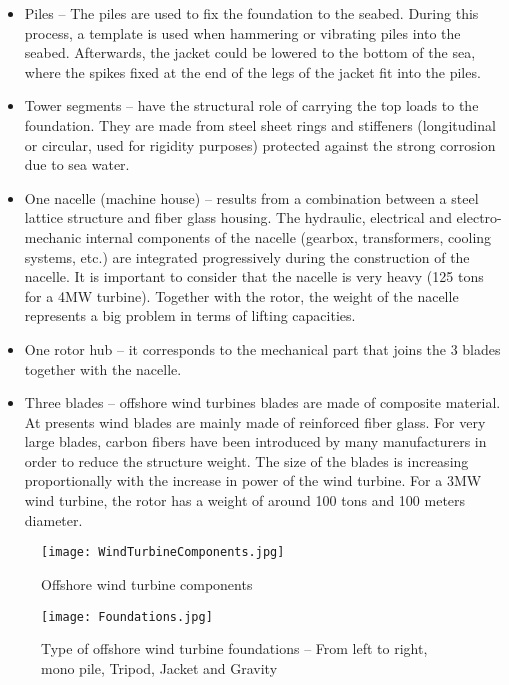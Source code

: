 \begin{itemize}
\item Piles -- The piles are used to fix the foundation to the seabed. During this process, a template is used when hammering or vibrating piles into the seabed. Afterwards, the jacket could be lowered to the bottom of the sea, where the spikes fixed at the end of the legs of the jacket fit into the piles.
\item Tower segments -- have the structural role of carrying the top loads to the foundation. They are made from steel sheet rings and stiffeners (longitudinal or circular, used for rigidity purposes) protected against the strong corrosion due to sea water.
\item One nacelle (machine house) -- results from a combination between a steel lattice structure and fiber glass housing. The hydraulic, electrical and electro-mechanic internal components of the nacelle (gearbox, transformers, cooling systems, etc.) are integrated progressively during the construction of the nacelle. It is important to consider that the nacelle is very heavy (125 tons for a 4MW turbine). Together with the rotor, the weight of the nacelle represents a big problem in terms of lifting capacities.
\item One rotor hub -- it corresponds to the mechanical part that joins the 3 blades together with the nacelle.
\item Three blades -- offshore wind turbines blades are made of composite material. At presents wind blades are mainly made of reinforced fiber glass. For very large blades, carbon fibers have been introduced by many manufacturers in order to reduce the structure weight. The size of the blades is increasing proportionally with the increase in power of the wind turbine. For a 3MW wind turbine, the rotor has a weight of around 100 tons and 100 meters diameter.
\end{itemize}


\begin{figure}[!hbp]
\begin{center}
\texttt{[image: WindTurbineComponents.jpg]} 
\end{center}
\caption{Offshore wind turbine components}
\label{FigureComponents}
\end{figure}

\begin{figure}[!hbp]
\begin{center}
\texttt{[image: Foundations.jpg]} 
\end{center}
\caption{Type of offshore wind turbine foundations -- From left to right, mono pile, Tripod, Jacket and Gravity}
\label{FigureFoundations}
\end{figure}

